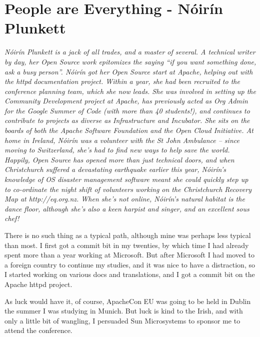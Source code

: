 \chapter{People are Everything - Nóirín Plunkett}

\textit{Nóirín Plunkett is a jack of all trades, and a master of several. A
technical writer by day, her Open Source work epitomizes the saying ``if you
want something done, ask a busy person''.
Nóirín got her Open Source start at Apache, helping out with the httpd
documentation project. Within a year, she had been recruited to the conference
planning team, which she now leads. She was involved in setting up the Community
Development project at Apache, has previously acted as Org Admin for the Google
Summer of Code (with more than 40 students!), and continues to contribute to
projects as diverse as Infrastructure and Incubator. She sits on the boards of
both the Apache Software Foundation and the Open Cloud Initiative.
At home in Ireland, Nóirín was a volunteer with the St John Ambulance -- since
moving to Switzerland, she’s had to find new ways to help save the world.
Happily, Open Source has opened more than just technical doors, and when
Christchurch suffered a devastating earthquake earlier this year, Nóirín’s
knowledge of OS disaster management software meant she could quickly step up to
co-ordinate the night shift of volunteers working on the Christchurch Recovery
Map at http://eq.org.nz.
When she’s not online, Nóirín’s natural habitat is the dance floor, although
she’s also a keen harpist and singer, and an excellent sous chef!}

There is no such thing as a typical path, although mine was perhaps
less typical than most. I first got a commit bit in my twenties, by
which time I had already spent more than a year working at Microsoft.
But after Microsoft I had moved to a foreign country to continue my
studies, and it was nice to have a distraction, so I started working
on various docs and translations, and I got a commit bit on the Apache
httpd project.

As luck would have it, of course, ApacheCon EU was going to be held in
Dublin the summer I was studying in Munich. But luck is kind to the
Irish, and with only a little bit of wangling, I persuaded Sun
Microsystems to sponsor me to attend the conference.

